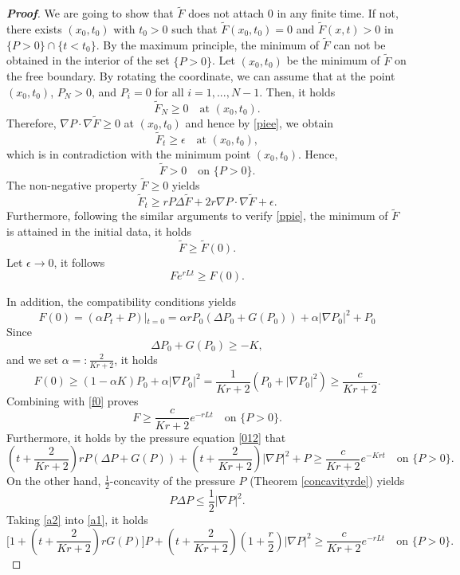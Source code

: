 \documentclass[10pt]{article}         %
\numberwithin{equation}{section}
\begin{document}
\begin{proof}[\bf Proof]
We are going to show that $\tilde{F}$ does not attach $0$ in any finite time. If not, there exists $(x_0,t_0)$ with $t_0>0$ such that $\tilde{F}(x_0,t_0)=0$ and $\tilde{F}(x,t)>0$ in $\{P>0\}\cap\{t<t_0\}$.
By the maximum principle, the minimum of $\tilde{F}$ can not be obtained in the interior of the set $\{P>0\}$. Let $(x_0,t_0)$ be the minimum of  $\tilde{F}$ on the free boundary. By rotating the coordinate, we can assume that at the point $(x_0,t_0)$, $P_N>0$, and $P_i=0$ for all $i=1,...,N-1$. Then, it holds
\[\tilde{F}_N\geq 0\quad \text{at }(x_0,t_0).\]
Therefore, $\nabla P\cdot \nabla \tilde{F}\geq 0$ at $(x_0,t_0)$ and hence by \eqref{piee}, we obtain 
\begin{equation*}
\tilde{F}_t\geq\epsilon\quad\text{at }(x_0,t_0),
\end{equation*}
which is in contradiction with the minimum point $(x_0,t_0)$. Hence, 
\begin{equation}\label{ppie}\tilde{F}>0\quad\text{on } \{P>0\}.\end{equation}
The non-negative property $\tilde{F}\geq0$ yields
\begin{equation*}\label{pie}
  \tilde{F}_t\geq rP\Delta \tilde{F}+2r\nabla P\cdot\nabla \tilde{F}+\epsilon.  
\end{equation*}
Furthermore, following the similar arguments to verify \eqref{ppie}, the minimum of $\tilde{F}$ is attained in the initial data, it holds 
\begin{equation*}
\tilde{F}\geq \tilde{F}(0).
\end{equation*}
Let $\epsilon\to 0$, it follows
\begin{equation}\label{f0}
Fe^{rLt}\geq F(0).
\end{equation}



In addition, the compatibility conditions yields
$$F(0)=(\alpha P_t+P)|_{t=0}=\alpha r P_0(\Delta P_0+G(P_0))+\alpha|\nabla P_0|^2+P_0$$
Since $$\Delta P_0+G(P_0)\geq -K,$$ and we set $\alpha=:\frac{2}{Kr+2}$, it holds
\[F(0)\geq (1-\alpha K)P_0+\alpha |\nabla P_0|^2=\frac{1}{Kr+2}(P_0+|\nabla P_0|^2)\geq \frac{c}{Kr+2}.\]
Combining with \eqref{f0} proves
\[F\geq \frac{c}{Kr+2}e^{-rLt}\quad\text{on }\{P>0\}.\]
Furthermore, it holds by the pressure equation \eqref{012} that 
\begin{equation}\label{a1}
(t+\frac{2}{Kr+2})rP(\Delta P+G(P))+(t+\frac{2}{Kr+2})|\nabla P|^2+P\geq \frac{c}{Kr+2}e^{-Krt}\quad \text{on }\{P>0\}.
\end{equation}
On the other hand, $\frac{1}{2}$-concavity of the pressure $P$ (Theorem \ref{concavityrde}) yields 
\begin{equation}\label{a2}
P\Delta P\leq \frac{1}{2}|\nabla P|^2.
\end{equation}
Taking \eqref{a2} into \eqref{a1}, it holds 
\[\big[1+(t+\frac{2}{Kr+2})rG(P)\big]P+(t+\frac{2}{Kr+2})(1+\frac{r}{2})|\nabla P|^2\geq \frac{c}{Kr+2}e^{-rLt}\quad \text{on }\{P>0\}.\]
\end{proof}
\end{document}

